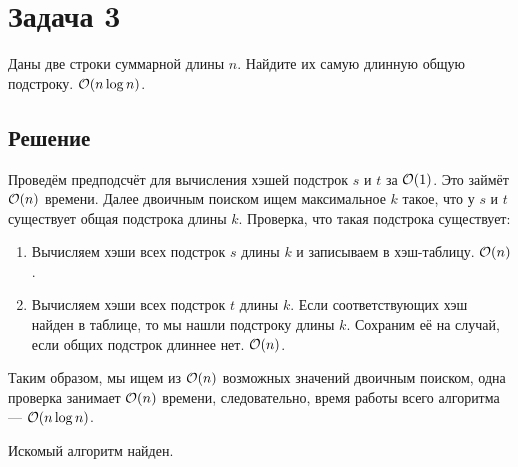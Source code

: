 \section{Задача 3}
Даны две строки суммарной длины $n$. Найдите их самую длинную общую подстроку. $\mathcal{O}(n \log n)$.

\subsection{Решение}
Проведём предподсчёт для вычисления хэшей подстрок $s$ и $t$ за $\mathcal{O}(1)$.
Это займёт $\mathcal{O}(n)$ времени.
Далее двоичным поиском ищем максимальное $k$ такое, что у $s$ и $t$ существует общая подстрока длины $k$.
Проверка, что такая подстрока существует:
\begin{enumerate}
\item Вычисляем хэши всех подстрок $s$ длины $k$ и записываем в хэш-таблицу. $\mathcal{O}(n)$.
\item Вычисляем хэши всех подстрок $t$ длины $k$. Если соответствующих хэш найден в таблице,
то мы нашли подстроку длины $k$. Сохраним её на случай, если общих подстрок длиннее нет. $\mathcal{O}(n)$.
\end{enumerate}

Таким образом, мы ищем из $\mathcal{O}(n)$ возможных значений двоичным поиском,
одна проверка занимает $\mathcal{O}(n)$ времени, следовательно,
время работы всего алгоритма --- $\mathcal{O}(n \log n)$.

Искомый алгоритм найден.
